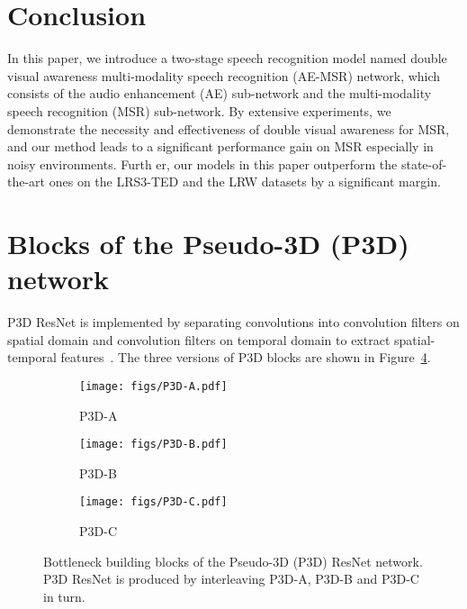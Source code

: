 \documentclass[10pt,twocolumn,letterpaper]{article}
\begin{document}
\section{Conclusion}

In this paper, we introduce a two-stage speech recognition model named double visual awareness multi-modality speech recognition (AE-MSR) network, which consists of the audio enhancement (AE) sub-network and the multi-modality speech recognition (MSR) sub-network. By extensive experiments, we demonstrate the necessity and effectiveness of double visual awareness for MSR, and our method leads to a significant performance gain on MSR especially in noisy environments. Furth er, our models in this paper outperform the state-of-the-art ones on the LRS3-TED and the LRW datasets by a significant margin.
{\small


}
\clearpage
\pagestyle{empty}
\renewcommand{\thesection}{\Alph{section}}
\setcounter{section}{0}
\section{Blocks of the Pseudo-3D (P3D) network}\label{P3D}

P3D ResNet is implemented by separating  convolutions into  convolution filters on spatial domain and  convolution filters on temporal domain to extract spatial-temporal features~\cite{qiu2017learning}. The three versions of P3D blocks are shown in Figure~\ref{fig:P3D}.
\begin{figure}[h]
\centering
    \begin{subfigure}[t]{1in}
\texttt{[image: figs/P3D-A.pdf]}
\caption{P3D-A}\label{fig:P3D-a}
    \end{subfigure}
\begin{subfigure}[t]{1in}
\texttt{[image: figs/P3D-B.pdf]}
\caption{P3D-B}\label{fig:P3D-b}
    \end{subfigure}
    \quad
    \begin{subfigure}[t]{1in}
        \centering
        \texttt{[image: figs/P3D-C.pdf]}
\caption{P3D-C}\label{fig:P3D-c}
    \end{subfigure}
\caption{Bottleneck building blocks of the Pseudo-3D (P3D) ResNet network. P3D ResNet is produced by interleaving P3D-A, P3D-B and P3D-C in turn.}
\label{fig:P3D}
\vspace{-16pt}
\end{figure}
\end{document}
